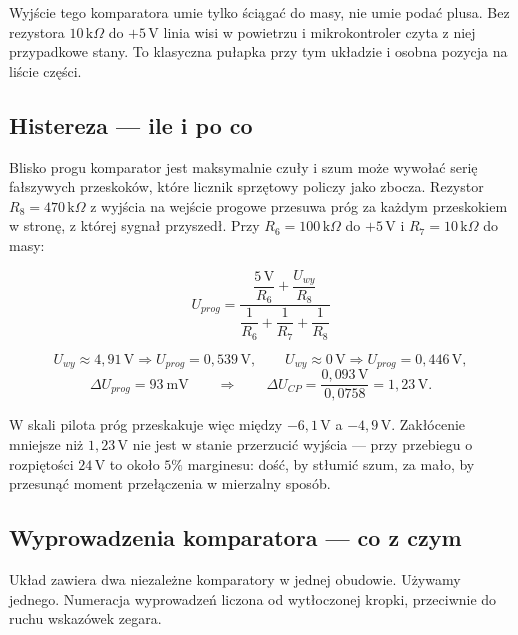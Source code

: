 \documentclass[a4paper,11pt]{article}
\newcommand{\kohm}{\,\mathrm{k}\Omega}
\newcommand{\volt}{\,\mathrm{V}}
\begin{document}
Wyjście tego komparatora umie tylko ściągać do masy, nie umie podać plusa. Bez
rezystora $10\kohm$ do $+5\volt$ linia wisi w powietrzu i mikrokontroler czyta z niej
przypadkowe stany. To klasyczna pułapka przy tym układzie i osobna pozycja na
liście części.

\subsection{Histereza --- ile i po co}

Blisko progu komparator jest maksymalnie czuły i szum może wywołać serię fałszywych
przeskoków, które licznik sprzętowy policzy jako zbocza. Rezystor $R_8=470\kohm$
z wyjścia na wejście progowe przesuwa próg za każdym przeskokiem w stronę, z której
sygnał przyszedł. Przy $R_6=100\kohm$ do $+5\volt$ i $R_7=10\kohm$ do masy:

\begin{equation}
U_{prog}=\frac{\dfrac{5\volt}{R_6}+\dfrac{U_{wy}}{R_8}}
              {\dfrac{1}{R_6}+\dfrac{1}{R_7}+\dfrac{1}{R_8}}
\label{eq:histereza}
\end{equation}

\[
U_{wy}\approx 4{,}91\volt \Rightarrow U_{prog}=0{,}539\volt,
\qquad
U_{wy}\approx 0\volt \Rightarrow U_{prog}=0{,}446\volt,
\]
\[
\Delta U_{prog}=93\ \mathrm{mV}
\qquad\Longrightarrow\qquad
\Delta U_{CP}=\frac{0{,}093\volt}{0{,}0758}=1{,}23\volt .
\]

W skali pilota próg przeskakuje więc między $-6{,}1\volt$ a $-4{,}9\volt$.
Zakłócenie mniejsze niż $1{,}23\volt$ nie jest w stanie przerzucić wyjścia --- przy
przebiegu o rozpiętości $24\volt$ to około $5\%$ marginesu: dość, by stłumić szum,
za mało, by przesunąć moment przełączenia w mierzalny sposób.

\subsection{Wyprowadzenia komparatora --- co z czym}
\label{sec:nozki}

Układ zawiera dwa niezależne komparatory w jednej obudowie. Używamy jednego.
Numeracja wyprowadzeń liczona od wytłoczonej kropki, przeciwnie do ruchu wskazówek
zegara.
\end{document}
